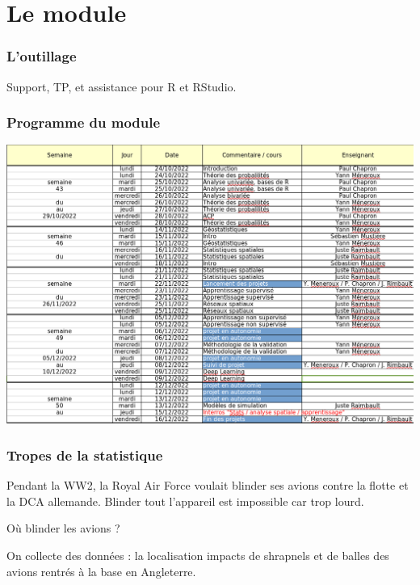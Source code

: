 \documentclass{beamer}
\begin{document}
\section{Le module}



\begin{frame}
\frametitle{L'outillage}


Support, TP, et assistance pour R et RStudio.



\end{frame}










\begin{frame}
\frametitle{Programme du module}


\centering
\includegraphics[width=\textwidth,keepaspectratio]{img/agenda2022.png}

\end{frame}








\begin{frame}
\frametitle{Tropes de la statistique}


Pendant la WW2, la Royal Air Force  voulait blinder ses avions contre la flotte et la DCA allemande. Blinder tout l'appareil est impossible car trop lourd. 

\alert{Où} blinder les avions ? 


On collecte des données : la localisation impacts de shrapnels  et de balles des avions \alert{rentrés} à la base en Angleterre. 
\end{frame}
\end{document}
